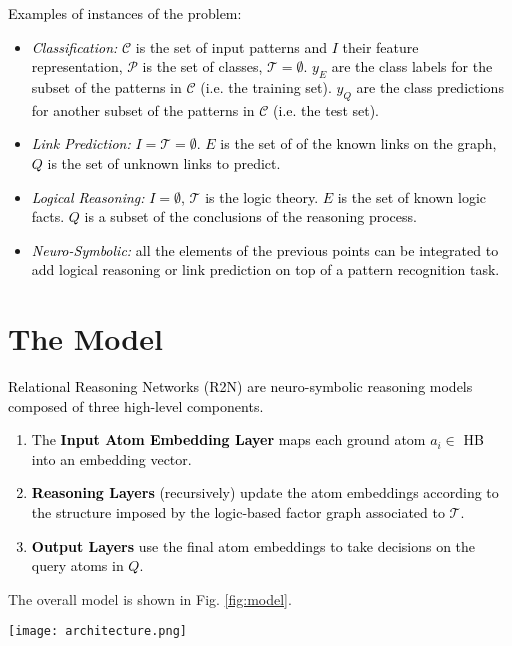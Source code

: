 \documentclass[journal]{IEEEtran}
\newcommand{\ar}[1]{\textcolor{black}{#1}}
\begin{document}
\ar{Examples of instances of the problem:}

\begin{itemize}
    \item \ar{\textit{Classification:} $\mathcal{C}$ is the set of input patterns and $I$ their feature representation, $\mathcal{P}$ is the set of  classes, $\mathcal{T}=\emptyset$. $y_E$ are the class labels for the subset of the patterns in $\mathcal{C}$ (i.e. the training set). $y_Q$ are the class predictions for another subset of the patterns in $\mathcal{C}$ (i.e. the test set).}
    \item \ar{\textit{Link Prediction:} $I=\mathcal{T}=\emptyset$. $E$ is the set of of the known links on the graph, $Q$ is the set of unknown links to predict.}
    \item \ar{\textit{Logical Reasoning:} $I=\emptyset$, $\mathcal{T}$ is the logic theory. $E$ is the set of known logic facts.  $Q$ is a subset of the conclusions of the reasoning process.}

    \item \ar{\textit{Neuro-Symbolic:} all the elements of the previous points can be integrated to add logical reasoning or link prediction on top of a pattern recognition task.}
\end{itemize}

\section{The Model}
\label{sec:model}
\ar{Relational Reasoning Networks (R2N) are neuro-symbolic reasoning models composed of three high-level components.}
\ar{\begin{enumerate}
\item The \textbf{Input Atom Embedding Layer} maps each ground atom $a_i\in$ HB into an embedding vector.
\item \textbf{Reasoning Layers} (recursively) update the atom embeddings according to the structure imposed by the logic-based factor graph associated to $\mathcal{T}$. %
\item \textbf{Output Layers} use the final atom embeddings to take decisions on the query atoms in $Q$. %
\end{enumerate}
}
The overall model is shown in Fig. \ref{fig:model}.
\begin{figure*}[t]
    \centering
   \texttt{[image: architecture.png]}
\caption{\ar{\textbf{Overall structure of the model}. The model can be seamlessly used to: \textit{(i)} \textit{classify} whether $a \in \mathcal{C}$ smokes by computing $out(S(a))$; \textit{(ii)} \textit{predict the link} stating whether $a,b \in \mathcal{C}$ are friends by computing $out(F(a,b))$; and \textit{(iii)} \textit{reason} about $b \in \mathcal{C}$ smoking because being a friend of the smoker $a$ by exploiting the rule $F(a,b) \wedge S(a) \rightarrow S(b)$.}
}
    \label{fig:model} 
\end{figure*}
\end{document}

